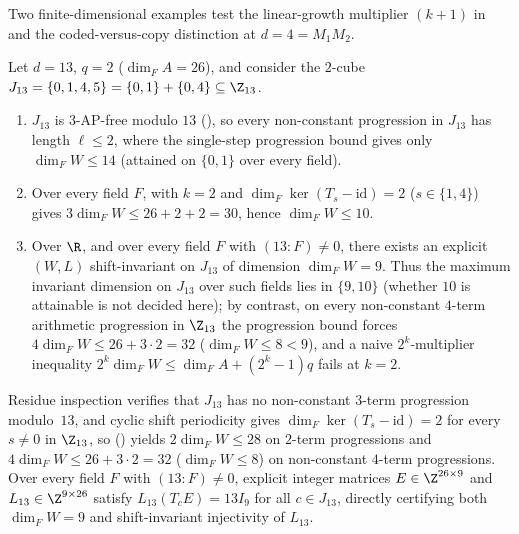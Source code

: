 Two finite-dimensional examples test the linear-growth multiplier $(k+1)$ in 
and the coded-versus-copy distinction at $d = 4 = M_1 M_2$.

\begin{example}[$3$-AP-free $2$-cube witness at $d = 13$ ($9 \le \max\dim_F W \le 10$)]\label{ex:d13-witness}
Let $d = 13$, $q = 2$ ($\dim_F A = 26$), and consider the $2$-cube
$J_{13} = \{0, 1, 4, 5\} = \{0,1\} + \{0,4\} \subseteq \Z_{13}$.
\begin{enumerate}[label=(\alph*)]
\item $J_{13}$ is $3$-AP-free modulo $13$ (), so every non-constant progression
  in $J_{13}$ has length $\ell \le 2$, where the single-step progression bound gives only
  $\dim_F W \le 14$ (attained on $\{0,1\}$ over every field).
\item Over every field $F$,  with $k = 2$ and
  $\dim_F\ker(T_s - \mathrm{id}) = 2$ ($s \in \{1,4\}$) gives $3\dim_F W \le 26 + 2 + 2 = 30$, hence
  $\dim_F W \le 10$.
\item Over $\R$, and over every field $F$ with $(13 : F) \ne 0$, there exists an explicit $(W, L)$
  shift-invariant on $J_{13}$ of dimension $\dim_F W = 9$. Thus the maximum invariant dimension on
  $J_{13}$ over such fields lies in $\{9, 10\}$ (whether $10$ is attainable is not decided here); by
  contrast, on every non-constant $4$-term arithmetic progression in $\Z_{13}$ the progression bound
  forces $4\dim_F W \le 26 + 3 \cdot 2 = 32$ ($\dim_F W \le 8 < 9$), and a naive $2^k$-multiplier
  inequality $2^k \dim_F W \le \dim_F A + (2^k - 1)q$ fails at $k = 2$.
\end{enumerate}
\end{example}
\begin{outline}
Residue inspection verifies that $J_{13}$ has no non-constant $3$-term progression modulo~$13$, and
cyclic shift periodicity gives $\dim_F\ker(T_s - \mathrm{id}) = 2$ for every $s \ne 0$ in $\Z_{13}$,
so \cite[Lemma~6.1]{SharedDecoders2026} () yields
$2\dim_F W \le 28$ on $2$-term progressions and $4\dim_F W \le 26 + 3\cdot 2 = 32$ ($\dim_F W \le 8$)
on non-constant $4$-term progressions.
Over every field $F$ with $(13 : F) \ne 0$, explicit integer matrices $E \in \Z^{26\times 9}$ and
$L_{13} \in \Z^{9\times 26}$ satisfy $L_{13}(T_c E) = 13 I_9$ for all $c \in J_{13}$, directly
certifying both $\dim_F W = 9$ and shift-invariant injectivity of $L_{13}$.
\end{outline}

